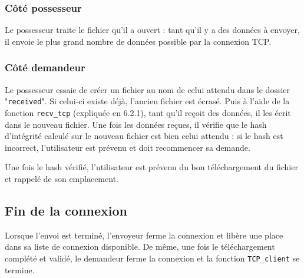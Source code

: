 \subsubsection{Côté possesseur}
Le possesseur traite le fichier qu'il a ouvert : tant qu'il y a des données à envoyer, il envoie le plus grand nombre de données possible par la connexion TCP.


\subsubsection{Côté demandeur}
Le possesseur essaie de créer un fichier au nom de celui attendu dans le dossier "\verb|received|". Si celui-ci existe déjà, l'ancien fichier est écrasé.
\vskip 0.25cm
Puis à l'aide de la fonction \verb|recv_tcp| (expliquée en 6.2.1), tant qu'il reçoit des données, il les écrit dans le nouveau fichier. Une fois les données reçues, il vérifie que le hash d'intégrité calculé sur le nouveau fichier est bien celui attendu : si le hash est incorrect, l'utilisateur est prévenu et doit recommencer sa demande.
\vskip 0.25cm

Une fois le hash vérifié, l'utilisateur est prévenu du bon téléchargement du fichier et rappelé de son emplacement.

\subsection{Fin de la connexion}
Lorsque l'envoi est terminé, l'envoyeur ferme la connexion et libère une place dans sa liste de connexion disponible. De même, une fois le téléchargement complété et validé, le demandeur ferme la connexion et la fonction \verb|TCP_client| se termine.